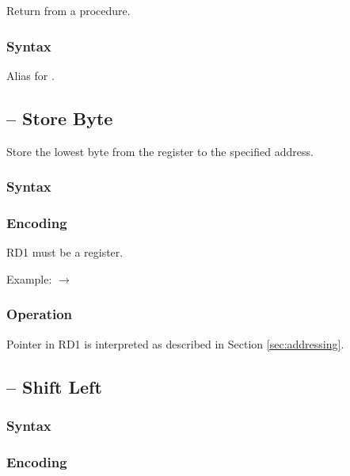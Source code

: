 \documentclass[a4paper,12pt,twoside,extrafontsizes]{memoir}
\begin{document}
{Return from a procedure.

\subsubsection{Syntax}


Alias for .

\subsection{ -- Store Byte}
\label{subsec:instr:sb}

Store the lowest byte from the register to the specified address.

\subsubsection{Syntax}


\subsubsection{Encoding}


RD1 must be a register.

Example:  $\rightarrow$ 

\subsubsection{Operation}


Pointer in RD1 is interpreted as described in Section \ref{sec:addressing}.

\subsection{ -- Shift Left}
\label{subsec:instr:sl}

\subsubsection{Syntax}


\subsubsection{Encoding}

}
\end{document}
